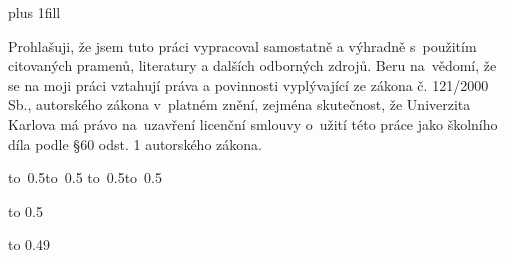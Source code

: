 \newpage


\openright
\hypersetup{pageanchor=true}
\vglue 0pt plus 1fill

\noindent
Prohlašuji, že jsem tuto \ThesisTypeAccusative{} práci vypracoval samostatně a výhradně
s~použitím citovaných pramenů, literatury a dalších odborných zdrojů.
Beru na~vědomí, že se na moji práci vztahují práva a povinnosti vyplývající
ze zákona č. 121/2000 Sb., autorského zákona v~platném znění, zejména skutečnost,
že Univerzita Karlova má právo na~uzavření licenční smlouvy o~užití této
práce jako školního díla podle §60 odst. 1 autorského zákona.

\vspace{10mm}

\hbox{\hbox to 0.5\hbox to 0.5\hsize{\dotfill\quad}}
\smallskip
\hbox{\hbox to 0.5\hsize{}\hbox to 0.5}

\vspace{20mm}
\newpage


\openright

\noindent
\Dedication

\newpage


\openright
{\InfoPageFont

\vtop to 0.5

\vtop to 0.49

}

\newpage

\pagestyle{plain}
